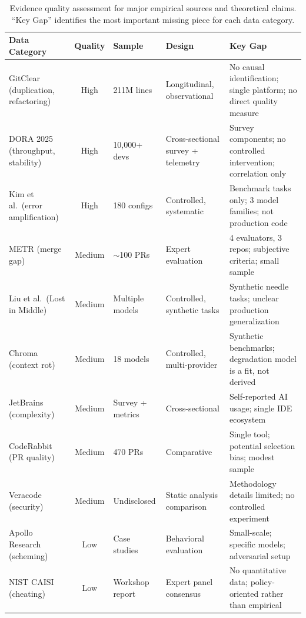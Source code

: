 \documentclass[11pt, a4paper, logo, copyright]{googledeepmind}
\begin{document}
\begin{table}[H]
\centering
\caption{Evidence quality assessment for major empirical sources and theoretical claims. ``Key Gap'' identifies the most important missing piece for each data category.}
\label{tab:evidence-quality}
\footnotesize
\begin{tabular}{p{2.4cm}cp{1.5cm}p{2cm}p{4cm}}
\toprule
\textbf{Data Category} & \textbf{Quality} & \textbf{Sample} & \textbf{Design} & \textbf{Key Gap} \\
\midrule
GitClear (duplication, refactoring) & High & 211M lines & Longitudinal, observational & No causal identification; single platform; no direct quality measure \\
\addlinespace
DORA 2025 (throughput, stability) & High & 10,000+ devs & Cross-sectional survey + telemetry & Survey components; no controlled intervention; correlation only \\
\addlinespace
Kim et al.\ (error amplification) & High & 180 configs & Controlled, systematic & Benchmark tasks only; 3 model families; not production code \\
\addlinespace
METR (merge gap) & Medium & $\sim$100 PRs & Expert evaluation & 4 evaluators, 3 repos; subjective criteria; small sample \\
\addlinespace
Liu et al.\ (Lost in Middle) & Medium & Multiple models & Controlled, synthetic tasks & Synthetic needle tasks; unclear production generalization \\
\addlinespace
Chroma (context rot) & Medium & 18 models & Controlled, multi-provider & Synthetic benchmarks; degradation model is a fit, not derived \\
\addlinespace
JetBrains (complexity) & Medium & Survey + metrics & Cross-sectional & Self-reported AI usage; single IDE ecosystem \\
\addlinespace
CodeRabbit (PR quality) & Medium & 470 PRs & Comparative & Single tool; potential selection bias; modest sample \\
\addlinespace
Veracode (security) & Medium & Undisclosed & Static analysis comparison & Methodology details limited; no controlled experiment \\
\addlinespace
Apollo Research (scheming) & Low & Case studies & Behavioral evaluation & Small-scale; specific models; adversarial setup \\
\addlinespace
NIST CAISI (cheating) & Low & Workshop report & Expert panel consensus & No quantitative data; policy-oriented rather than empirical \\

\end{tabular}
\end{table}
\end{document}
